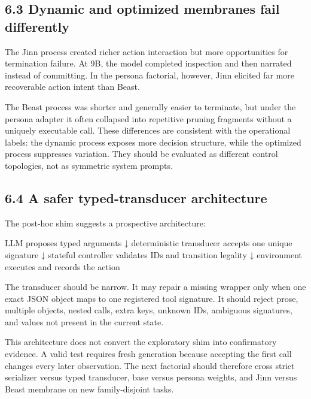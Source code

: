 \documentclass[
  11pt,
  letterpaper,
]{article}
\newenvironment{Shaded}{}{}
\newcommand{\NormalTok}[1]{#1}
\begin{document}
\subsection{6.3 Dynamic and optimized membranes fail
differently}\label{dynamic-and-optimized-membranes-fail-differently}

The Jinn process created richer action interaction but more
opportunities for termination failure. At 9B, the model completed
inspection and then narrated instead of committing. In the persona
factorial, however, Jinn elicited far more recoverable action intent
than Beast.

The Beast process was shorter and generally easier to terminate, but
under the persona adapter it often collapsed into repetitive pruning
fragments without a uniquely executable call. These differences are
consistent with the operational labels: the dynamic process exposes more
decision structure, while the optimized process suppresses variation.
They should be evaluated as different control topologies, not as
symmetric system prompts.

\subsection{6.4 A safer typed-transducer
architecture}\label{a-safer-typed-transducer-architecture}

The post-hoc shim suggests a prospective architecture:

\begin{Shaded}
\begin{Highlighting}[]
\NormalTok{LLM proposes typed arguments}
\NormalTok{        ↓}
\NormalTok{deterministic transducer accepts one unique signature}
\NormalTok{        ↓}
\NormalTok{stateful controller validates IDs and transition legality}
\NormalTok{        ↓}
\NormalTok{environment executes and records the action}
\end{Highlighting}
\end{Shaded}

The transducer should be narrow. It may repair a missing wrapper only
when one exact JSON object maps to one registered tool signature. It
should reject prose, multiple objects, nested calls, extra keys, unknown
IDs, ambiguous signatures, and values not present in the current state.

This architecture does not convert the exploratory shim into
confirmatory evidence. A valid test requires fresh generation because
accepting the first call changes every later observation. The next
factorial should therefore cross strict serializer versus typed
transducer, base versus persona weights, and Jinn versus Beast membrane
on new family-disjoint tasks.
\end{document}
